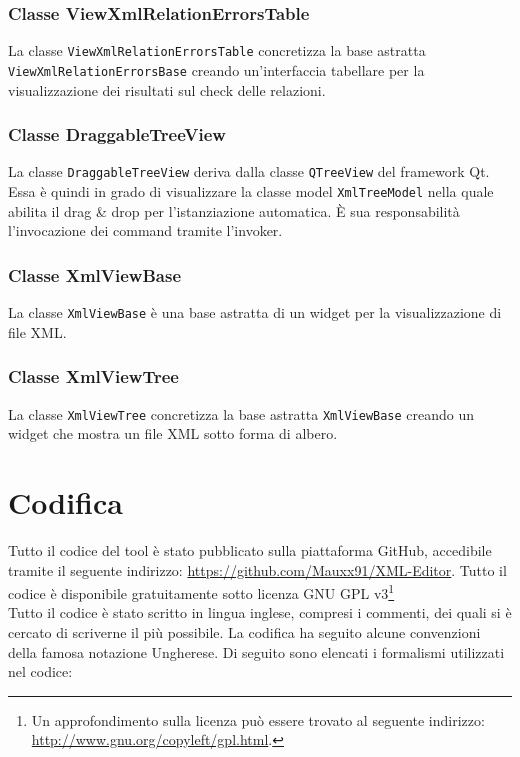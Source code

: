 	\subsubsection{Classe ViewXmlRelationErrorsTable}
		La classe \texttt{ViewXmlRelationErrorsTable} concretizza la base astratta \texttt{ViewXmlRelationErrorsBase} creando un'interfaccia tabellare per la visualizzazione dei risultati sul check delle relazioni.

	\subsubsection{Classe DraggableTreeView}
		La classe \texttt{DraggableTreeView} deriva dalla classe \texttt{QTreeView} del framework Qt\textregistered. Essa è quindi in grado di visualizzare la classe model \texttt{XmlTreeModel} nella quale abilita il drag \& drop per l'istanziazione automatica. È sua responsabilità l'invocazione dei command tramite l'invoker.
	
	
	\subsubsection{Classe XmlViewBase}
		La classe \texttt{XmlViewBase} è una base astratta di un widget per la visualizzazione di file XML.
	
	\subsubsection{Classe XmlViewTree}
		La classe \texttt{XmlViewTree} concretizza la base astratta \texttt{XmlViewBase} creando un widget che mostra un file XML sotto forma di albero.

\section{Codifica}
Tutto il codice del tool è stato pubblicato sulla piattaforma GitHub\textregistered, accedibile tramite il seguente indirizzo: \url{https://github.com/Mauxx91/XML-Editor}. Tutto il codice è disponibile gratuitamente sotto licenza GNU GPL v3\footnote{Un approfondimento sulla licenza può essere trovato al seguente indirizzo: \url{http://www.gnu.org/copyleft/gpl.html}.}\\

Tutto il codice è stato scritto in lingua inglese, compresi i commenti, dei quali si è cercato di scriverne il più possibile.
La codifica ha seguito alcune convenzioni della famosa notazione Ungherese. Di seguito sono elencati i formalismi utilizzati nel codice:

